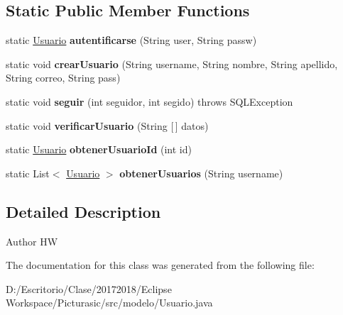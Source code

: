 \subsection*{Static Public Member Functions}
\begin{DoxyCompactItemize}
\item 
\mbox{\label{classmodelo_1_1_usuario_a613c5b0151db527d6fe2366734e6771e}} 
static \mbox{\hyperlink{classmodelo_1_1_usuario}{Usuario}} {\bfseries autentificarse} (String user, String passw)
\item 
\mbox{\label{classmodelo_1_1_usuario_afe6b558d3e9170ce7948098ab68de905}} 
static void {\bfseries crear\+Usuario} (String username, String nombre, String apellido, String correo, String pass)
\item 
\mbox{\label{classmodelo_1_1_usuario_a0ec21010c2d3c4bc3061cb9d879ccaf8}} 
static void {\bfseries seguir} (int seguidor, int segido)  throws S\+Q\+L\+Exception 
\item 
\mbox{\label{classmodelo_1_1_usuario_a19af904ce3274c36fe7dc32a5a9e924c}} 
static void {\bfseries verificar\+Usuario} (String \mbox{[}$\,$\mbox{]} datos)
\item 
\mbox{\label{classmodelo_1_1_usuario_a106897c3e42a861c5c90664c7907df9f}} 
static \mbox{\hyperlink{classmodelo_1_1_usuario}{Usuario}} {\bfseries obtener\+Usuario\+Id} (int id)
\item 
\mbox{\label{classmodelo_1_1_usuario_a4d1eaceea4954ca89fd870cd894c230c}} 
static List$<$ \mbox{\hyperlink{classmodelo_1_1_usuario}{Usuario}} $>$ {\bfseries obtener\+Usuarios} (String username)
\end{DoxyCompactItemize}


\subsection{Detailed Description}
\begin{DoxyAuthor}{Author}
HW 
\end{DoxyAuthor}


The documentation for this class was generated from the following file\+:\begin{DoxyCompactItemize}
\item 
D\+:/\+Escritorio/\+Clase/20172018/\+Eclipse Workspace/\+Picturasic/src/modelo/Usuario.\+java\end{DoxyCompactItemize}
